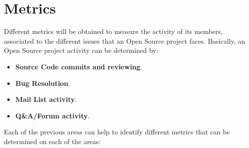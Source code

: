 \documentclass[a4paper, 12pt]{book}
\begin{document}
\section{Metrics}
\label{sec:odl_projeval_metrics}
Different metrics will be obtained to measure the activity of its members, associated to the different issues that an Open Source project faces. Basically, an Open Source project activity can be determined by:
\begin{itemize}\itemsep0pt
\item{\textbf{Source Code commits and reviewing}}.
\item{\textbf{Bug Resolution}}.
\item{\textbf{Mail List activity}}.
\item{\textbf{Q\&A/Forum activity}}.
\end{itemize}
Each of the previous areas can help to identify different metrics that can be determined on each of the areas:
\end{document}
